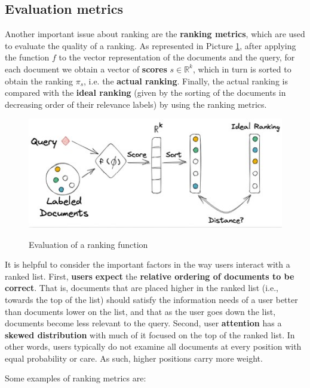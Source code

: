 \subsection{Evaluation metrics}
Another important issue about ranking are the \textbf{ranking metrics}, which are used to evaluate the quality of a ranking. As represented in Picture \ref{ranking metr}, after applying the function $f$ to the vector representation of the documents and the query, for each document we obtain a vector of \textbf{scores} $s \in \mathbb{R}^k$, which in turn is sorted to obtain the ranking $\pi_s$, i.e. the \textbf{actual ranking}. Finally, the actual ranking is compared with the \textbf{ideal ranking} (given by the sorting of the documents in decreasing order of their relevance labels) by using the ranking metrics.

\begin{figure}[h!]
		\centering
		\includegraphics[scale = 2.0]{img/ranking metrics.jpg}
        \label{ranking metr}
        \caption{Evaluation of a ranking function}
\end{figure}

It is helpful to consider the important factors in the way users interact with a ranked list. First, \textbf{users} \textbf{expect} the \textbf{relative ordering of documents to be correct}. That is, documents that are placed higher in the ranked list (i.e., towards the top of the list) should satisfy the information needs of a user better than documents lower on the list, and that as the user goes down the list, documents become less relevant to the query. Second, user \textbf{attention} has a \textbf{skewed distribution} with much of it focused on the top of the ranked list. In other words, users typically do not examine all documents at every position with equal probability or care. As such, higher positions carry more weight.

Some examples of ranking metrics are:

